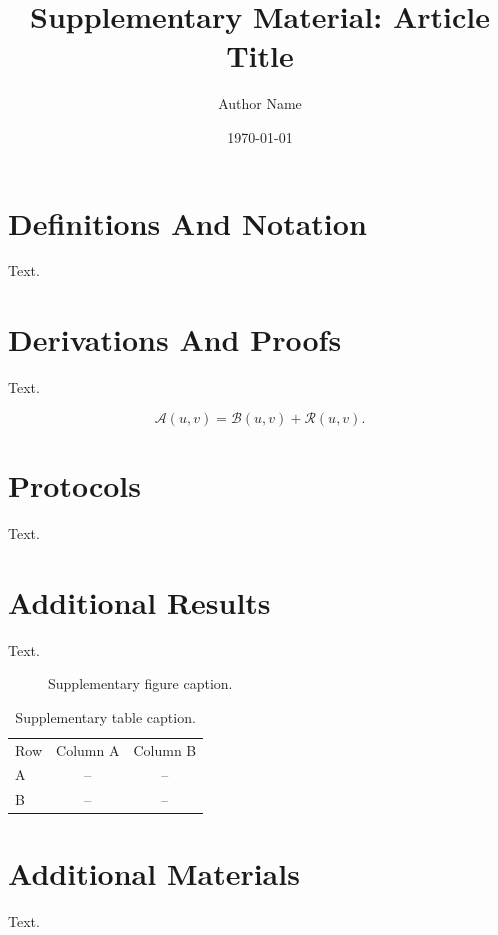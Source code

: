 \documentclass[aps,preprint,superscriptaddress,nofootinbib,longbibliography]{revtex4-2}
\theoremstyle{definition}
\theoremstyle{remark}
\begin{document}
\title{Supplementary Material: Article Title}

\author{Author Name}

\date{\today}

\maketitle

\section{Definitions And Notation}

Text.

\section{Derivations And Proofs}

Text.

\begin{equation}
  \mathcal{A}(u,v) = \mathcal{B}(u,v) + \mathcal{R}(u,v).
  \label{eq:s-example}
\end{equation}

\section{Protocols}

Text.

\section{Additional Results}

Text.

\begin{figure}[t]
  \centering
  \fbox{\rule{0pt}{1.7in}\rule{0.80\textwidth}{0pt}}
  \caption{Supplementary figure caption.\label{fig:s-example}}
\end{figure}

\begin{table}[t]
  \caption{Supplementary table caption.\label{tab:s-example}}
  \begin{ruledtabular}
  \begin{tabular}{lcc}
  Row & Column A & Column B \\
  \colrule
  A & -- & -- \\
  B & -- & -- \\
  \end{tabular}
  \end{ruledtabular}
\end{table}

\section{Additional Materials}

Text.

\end{document}
